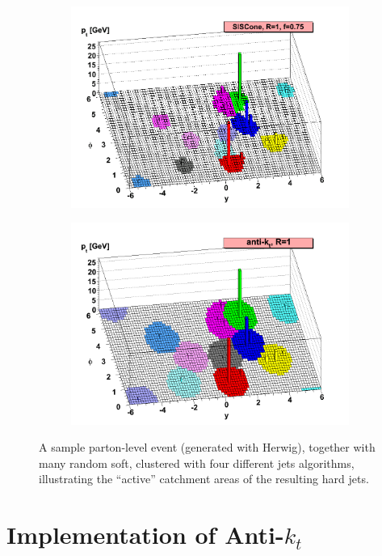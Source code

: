 \begin{figure}[h!]
\begin{subfigure}[h!]{0.495\textwidth}
        \includegraphics[width=\textwidth]{images/ff2.png}
        \label{fig:mouse}
    \end{subfigure}
        \begin{subfigure}[h!]{0.495\textwidth}
        \includegraphics[width=\textwidth]{images/ff3.png}
        \label{fig:mouse}
    \end{subfigure}

    \caption{A sample parton-level event (generated with Herwig), together with many random soft, clustered with four different jets algorithms, illustrating the “active” catchment areas of
the resulting hard jets.}\label{fig:jets}
\end{figure}

\section{Implementation of Anti-$k_t$}


